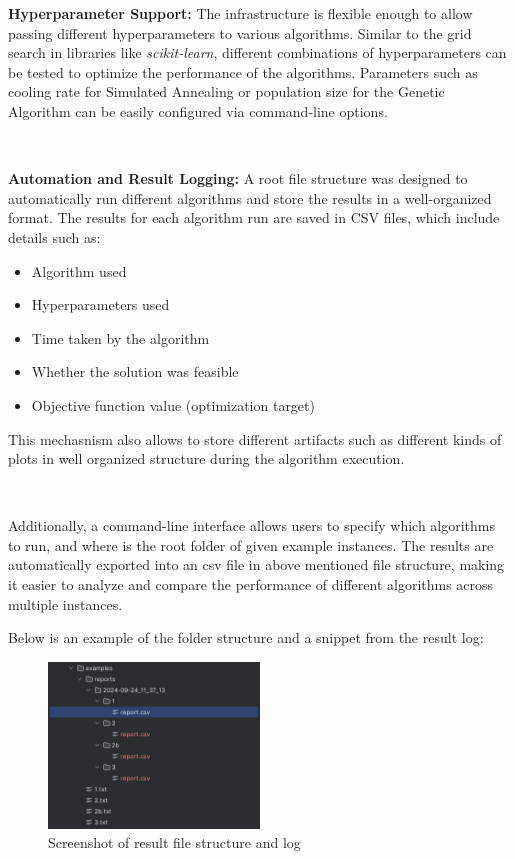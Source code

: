 \documentclass[a4paper,12pt]{article}
\begin{document}
\noindent \textbf{Hyperparameter Support:}
The infrastructure is flexible enough to allow passing different hyperparameters to various algorithms. Similar to the grid search in libraries like \textit{scikit-learn}, different combinations of hyperparameters can be tested to optimize the performance of the algorithms. Parameters such as cooling rate for Simulated Annealing or population size for the Genetic Algorithm can be easily configured via command-line options.

\

\noindent \textbf{Automation and Result Logging:}
A root file structure was designed to automatically run different algorithms and store the results in a well-organized format. The results for each algorithm run are saved in CSV files, which include details such as:
\begin{itemize}
    \item Algorithm used
    \item Hyperparameters used
    \item Time taken by the algorithm
    \item Whether the solution was feasible
    \item Objective function value (optimization target)
\end{itemize}

\noindent This mechasnism also allows to store different artifacts such as different kinds of plots in well organized structure during the algorithm execution.

\

\noindent Additionally, a command-line interface allows users to specify which algorithms to run, and where is the root folder of given example instances. The results are automatically exported into an csv file in above mentioned file structure, making it easier to analyze and compare the performance of different algorithms across multiple instances.

Below is an example of the folder structure and a snippet from the result log:

\begin{figure}[H]
    \centering
    \includegraphics[width=0.5\textwidth]{reports-structure.png}
    \caption{Screenshot of result file structure and log}
\end{figure}
\end{document}
